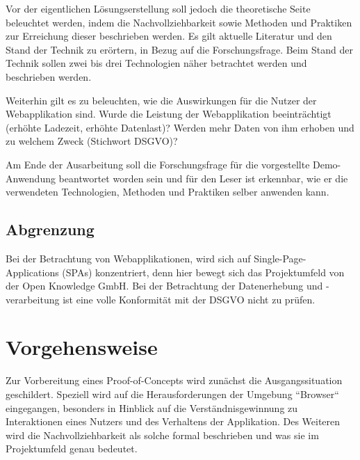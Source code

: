 Vor der eigentlichen Lösungserstellung soll jedoch die theoretische Seite beleuchtet werden, indem die Nachvollziehbarkeit sowie Methoden und Praktiken zur Erreichung dieser beschrieben werden. Es gilt aktuelle Literatur und den Stand der Technik zu erörtern, in Bezug auf die Forschungsfrage. Beim Stand der Technik sollen zwei bis drei Technologien näher betrachtet werden und beschrieben werden.

Weiterhin gilt es zu beleuchten, wie die Auswirkungen für die Nutzer der Webapplikation sind. Wurde die Leistung der Webapplikation beeinträchtigt (erhöhte Ladezeit, erhöhte Datenlast)? Werden mehr Daten von ihm erhoben und zu welchem Zweck (Stichwort DSGVO)?

Am Ende der Ausarbeitung soll die Forschungsfrage für die vorgestellte Demo-Anwendung beantwortet worden sein und für den Leser ist erkennbar, wie er die verwendeten Technologien, Methoden und Praktiken selber anwenden kann.

\subsection{Abgrenzung}


Bei der Betrachtung von Webapplikationen, wird sich auf Single-Page-Applications (SPAs) konzentriert, denn hier bewegt sich das Projektumfeld von der Open Knowledge GmbH. Bei der Betrachtung der Datenerhebung und -verarbeitung ist eine volle Konformität mit der DSGVO nicht zu prüfen.

\pagebreak

\section{Vorgehensweise}

Zur Vorbereitung eines Proof-of-Concepts wird zunächst die Ausgangssituation geschildert. Speziell wird auf die Herausforderungen der Umgebung ``Browser`` eingegangen, besonders in Hinblick auf die Verständnisgewinnung zu Interaktionen eines Nutzers und des Verhaltens der Applikation. Des Weiteren wird die Nachvollziehbarkeit als solche formal beschrieben und was sie im Projektumfeld genau bedeutet.

